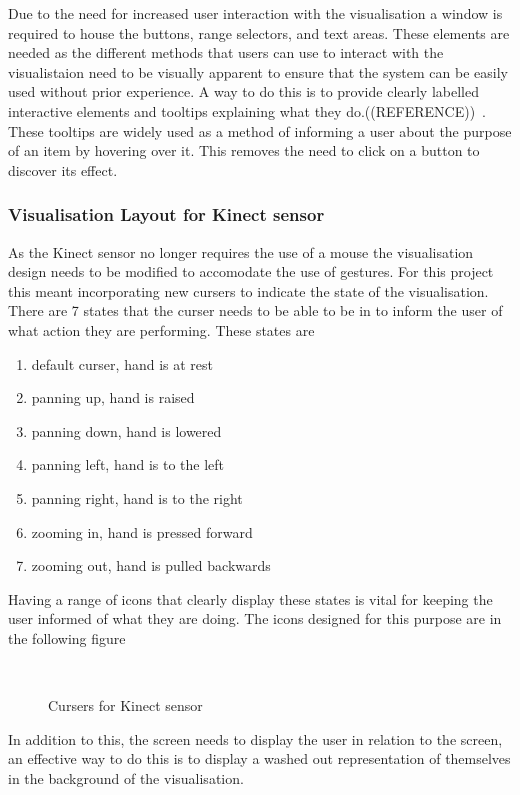 Due to the need for increased user interaction with the visualisation a window is required to house the buttons, range selectors, and text areas. These elements are needed as the different methods that users can use to interact with the visualistaion need to be visually apparent to ensure that the system can be easily used without prior experience. A way to do this is to provide clearly labelled interactive elements and tooltips explaining what they do.((REFERENCE))~. These tooltips are widely used as a method of informing a user about the purpose of an item by hovering over it. This removes the need to click on a button to discover its effect.

\subsubsection{Visualisation Layout for Kinect sensor}
As the Kinect sensor no longer requires the use of a mouse the visualisation design needs to be modified to accomodate the use of gestures. For this project this meant incorporating new cursers to indicate the state of the visualisation. There are 7 states that the curser needs to be able to be in to inform the user of what action they are performing. These states are

\begin{enumerate}
 \item default curser, hand is at rest
 \item panning up, hand is raised
 \item panning down, hand is lowered
 \item panning left, hand is to the left
 \item panning right, hand is to the right
 \item zooming in, hand is pressed forward
 \item zooming out, hand is pulled backwards
\end{enumerate}

Having a range of icons that clearly display these states is vital for keeping the user informed of what they are doing. The icons designed for this purpose are in the following figure

\begin{figure}[h!]
  \centering
  ~
  \caption{Cursers for Kinect sensor}  
\end{figure}

In addition to this, the screen needs to display the user in relation to the screen, an effective way to do this is to display a washed out representation of themselves in the background of the visualisation. 